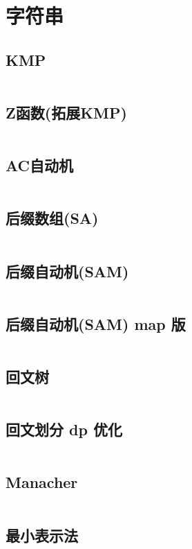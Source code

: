 \documentclass[twoside,twocolumn]{article}
\begin{document}
\section{字符串}

\subsection{KMP}
\inputminted[breaklines, frame=single]{c++}{../algo/字符串/KMP.cpp}

\subsection{Z函数(拓展KMP)}
\inputminted[breaklines, frame=single]{c++}{../algo/字符串/Z函数.cpp}


\subsection{AC自动机}
\inputminted[breaklines, frame=single]{c++}{../algo/字符串/AC自动机.cpp}


\subsection{后缀数组(SA)}
\inputminted[breaklines, frame=single]{c++}{../algo/字符串/SA.cpp}

\subsection{后缀自动机(SAM)}
\inputminted[breaklines, frame=single]{c++}{../algo/字符串/SAM.cpp}


\subsection{后缀自动机(SAM) map 版}
\inputminted[breaklines, frame=single, highlightlines={3,10,15,18}]{c++}{../algo/字符串/SAM(map版).cpp}

\subsection{回文树}
\inputminted[breaklines, frame=single]{c++}{../algo/字符串/PAM.cpp}


\subsection{回文划分 dp 优化}
\inputminted[breaklines, frame=single]{c++}{../algo/字符串/PAM-回文划分.cpp}

\subsection{Manacher}
\inputminted[breaklines, frame=single]{c++}{../algo/字符串/manacher.cpp}

\subsection{最小表示法}
\inputminted[breaklines, frame=single]{c++}{../algo/字符串/最小表示法.cpp}



\end{document}
